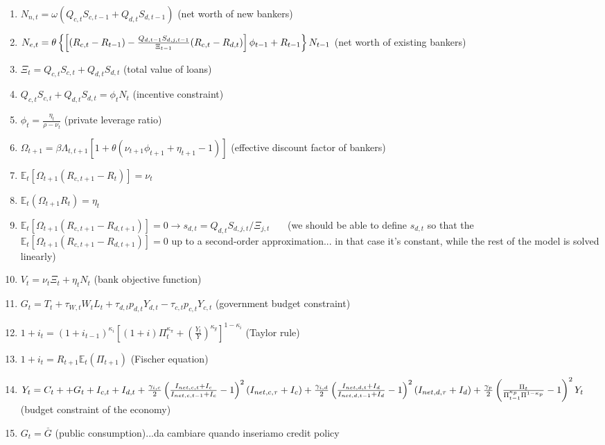 \documentclass{article}
\begin{document}
\begin{enumerate}
\item $N_{n,t}=\omega (Q_{c,t}S_{c,t-1}+Q_{d,t}S_{d,t-1})$ (net worth of new
bankers)

\item $N_{e,t}=\theta \left\{ \left[ (R_{c,t}-R_{t-1})-\frac{%
Q_{d,t-1}S_{d,j,t-1}}{\Xi _{t-1}}(R_{c,t}-R_{d,t})\right] \phi
_{t-1}+R_{t-1}\right\} N_{t-1}$ (net worth of existing bankers)

\item $\Xi _{t}=Q_{c,t}S_{c,t}+Q_{d,t}S_{d,t}$ (total value of loans)

\item $Q_{c,t}S_{c,t}+Q_{d,t}S_{d,t}=\phi _{t}N_{t}$ (incentive constraint)

\item $\phi _{t}=\frac{\eta _{t}}{\rho -\nu _{t}}$ (private leverage ratio)

\item $\Omega _{t+1}=\beta \Lambda _{t,t+1}\left[ 1+\theta (\nu _{t+1}\phi
_{t+1}+\eta _{t+1}-1)\right] $ (effective discount factor of bankers)

\item $\mathbb{E}_{t}\left[ \Omega _{t+1}(R_{c,t+1}-R_{t})\right] =\nu _{t}$

\item $\mathbb{E}_{t}\left( \Omega _{t+1}R_{t}\right) =\eta _{t}$

\item $\mathbb{E}_{t}\left[ \Omega _{t+1}(R_{c,t+1}-R_{d,t+1})\right]
=0\rightarrow s_{d,t}=Q_{d,t}S_{d,j,t}/\Xi _{j,t}$ \ \ \ (we should be able
to define $s_{d,t}$ so that the $\mathbb{E}_{t}\left[ \Omega
_{t+1}(R_{c,t+1}-R_{d,t+1})\right] =0$ up to a second-order approximation...
in that case it's constant, while the rest of the model is solved linearly)

\item $V_{t}=\nu _{t}\Xi _{t}+\eta _{t}N_{t}$ (bank objective function)

\item $G_{t}=T_{t}+\tau _{W,t}W_{t}L_{t}+\tau _{d,t}p_{d,t}Y_{d,t}-\tau
_{c,t}p_{c,t}Y_{c,t}$ (government budget constraint)

\item $1+i_{t}=(1+i_{t-1})^{\kappa _{i}}\left[ (1+i)\Pi _{t}^{\kappa _{\pi
}}+\left( \frac{Y_{t}}{Y}\right) ^{\kappa _{y}}\right] ^{1-\kappa _{i}}$
(Taylor rule)

\item $1+i_{t}=R_{t+1}\mathbb{E}_{t}(\Pi _{t+1})$ (Fischer equation)

\item $Y_{t}=C_{t}++G_{t}+I_{c,t}+I_{d,t}+\frac{\gamma _{i,c}}{2}\left( 
\frac{I_{net,c,t}+I_{c}}{I_{net,c,t-1}+I_{c}}-1\right) ^{2}\left(
I_{net,c,\tau }+I_{c}\right) +\frac{\gamma _{i,d}}{2}\left( \frac{%
I_{net,d,t}+I_{d}}{I_{net,d,t-1}+I_{d}}-1\right) ^{2}\left( I_{net,d,\tau
}+I_{d}\right) +\frac{\gamma _{p}}{2}\left( \frac{\Pi _{t}}{\Pi
_{t-1}^{\kappa _{p}}\Pi ^{1-\kappa _{p}}}-1\right) ^{2}Y_{t}$ (budget
constraint of the economy)

\item $G_{t}=\overset{\_}{G}$ (public consumption)...da cambiare quando
inseriamo credit policy
\end{enumerate}
\end{document}
